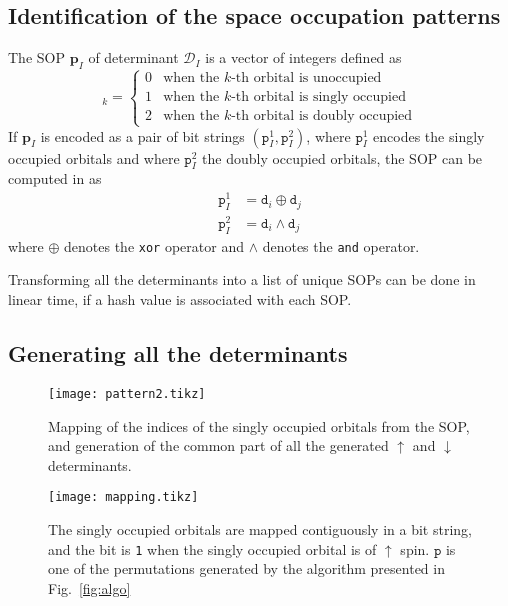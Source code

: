 \documentclass[aip,jcp,reprint,showkeys]{revtex4-1}
\newcommand{\md}{\mathtt{d}}
\newcommand{\mD}{\mathcal{D}}
\newcommand{\mpp}{\mathtt{p}}
\newcommand{\mpv}{\mathbf{p}}
\newcommand{\up}{\uparrow}
\newcommand{\dn}{\downarrow}
\newcommand{\sop}{SOP}
\newcommand{\one}{{\texttt{1}}}
\begin{document}
\subsection{Identification of the space occupation patterns}

The {\sop} $\mpv_I$ of determinant $\mD_I$ 
is a vector of integers defined as
\begin{equation}
  [\mpv_I]_k = 
  \begin{cases} 
    0 & \text{when the $k$-th orbital is unoccupied} \\
    1 & \text{when the $k$-th orbital is singly occupied} \\
    2 & \text{when the $k$-th orbital is doubly occupied}
  \end{cases} 
\end{equation}
If $\mpv_I$ is encoded as a pair of bit strings $(\mpp_I^1, \mpp_I^2)$, where
$\mpp_I^1$ encodes the singly occupied orbitals and where $\mpp_I^2$ the doubly
occupied orbitals, the {\sop} can be computed in as
\begin{align}
  \mpp_I^1 & = \md_i \oplus \md_j \\
  \mpp_I^2 & = \md_i \wedge \md_j 
\end{align}
where $\oplus$ denotes the \texttt{xor} operator and $\wedge$ denotes the
\texttt{and} operator.

Transforming all the determinants into a list of unique \sop s can be done
in linear time, if a hash value is associated with each \sop .\cite{Bitton_1983}

\subsection{Generating all the determinants}

\begin{figure}[t]
\texttt{[image: pattern2.tikz]}
\caption{Mapping of the indices of the singly occupied orbitals from the SOP,
and generation of the common part of all the generated $\up$ and $\dn$ determinants.}
\label{fig:mapping}
\end{figure}

\begin{figure}[t]
\texttt{[image: mapping.tikz]}
\caption{The singly occupied orbitals are mapped contiguously in a bit string,
and the bit is \one{} when the singly occupied orbital is of $\up$ spin. $\mpp$ is one of the permutations generated by the algorithm presented in Fig.~\ref{fig:algo}}
\label{fig:explode}
\end{figure}
\end{document}
